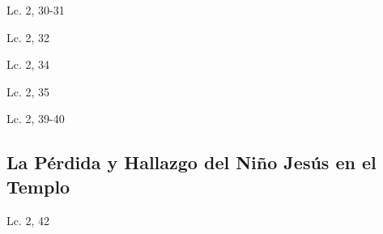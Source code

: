 \documentclass[a4paper,11pt,sans]{article}
\begin{document}
      \begin{multicols}{2}

      \columnbreak
          
      \end{multicols}
      \begin{center}
        Lc. 2, 30-31         
      \end{center}
      
      \begin{multicols}{2}

      \columnbreak
          
      \end{multicols}
      \begin{center}
        Lc. 2, 32        
      \end{center}
      
      \begin{multicols}{2}

      \columnbreak
          
      \end{multicols}
      \begin{center}
        Lc. 2, 34       
      \end{center}
      
      \begin{multicols}{2}

      \columnbreak
          
      \end{multicols}
      \begin{center}
        Lc. 2, 35         
      \end{center}      
      
      \begin{multicols}{2}

      \columnbreak
          
      \end{multicols}
      \begin{center}
        Lc. 2, 39-40         
      \end{center}
            
    \subsection*{\hfil La Pérdida y Hallazgo del Niño Jesús en el Templo \hfil}
      
      \begin{multicols}{2}

      \columnbreak
          
      \end{multicols}
      \begin{center}
        Lc. 2, 42     
      \end{center}
      
\end{document}
